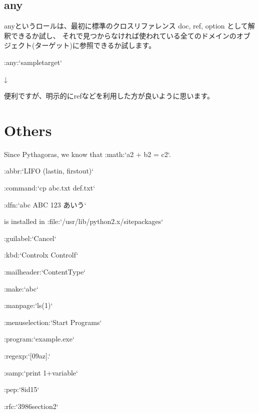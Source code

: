 \documentclass[letterpaper,10pt,dvipdfmx,openany,oneside]{sphinxmanual}
\begin{document}
{\hyperref[\detokenize{1.chapter/roles:sample-target}]{}}


\subsection{any}
\label{\detokenize{1.chapter/roles:any}}
anyというロールは、最初に標準のクロスリファレンス doc, ref, option として解釈できるか試し、
それで見つからなければ使われている全てのドメインのオブジェクト(ターゲット)に参照できるか試します。

%
\begin{sphinxVerbatim}[commandchars=\\\{\}]
:any:{}`sample\PYGZhy{}target{}`
\end{sphinxVerbatim}

↓

{\hyperref[\detokenize{1.chapter/roles:sample-target}]{}}

便利ですが、明示的にrefなどを利用した方が良いように思います。


\section{Others}
\label{\detokenize{1.chapter/roles:others}}
%
\begin{sphinxVerbatim}[commandchars=\\\{\}]
Since Pythagoras, we know that :math:{}`a\PYGZca{}2 + b\PYGZca{}2 = c\PYGZca{}2{}`.

:abbr:{}`LIFO (last\PYGZhy{}in, first\PYGZhy{}out){}`

:command:{}`cp abc.txt def.txt{}`

:dfn:{}`abc ABC 123 あいう{}`

is installed in :file:{}`/usr/lib/python2.\PYGZob{}x\PYGZcb{}/site\PYGZhy{}packages{}`

:guilabel:{}`\PYGZam{}Cancel{}`

:kbd:{}`Control\PYGZhy{}x Control\PYGZhy{}f{}`

:mailheader:{}`Content\PYGZhy{}Type{}`

:make:{}`abc{}`

:manpage:{}`ls(1){}`

:menuselection:{}`Start \PYGZhy{}\PYGZhy{}\PYGZgt{} Programs{}`

:program:{}`example.exe{}`

:regexp:{}`[0\PYGZhy{}9a\PYGZhy{}z].{}`

:samp:{}`print 1+\PYGZob{}variable\PYGZcb{}{}`

:pep:{}`8\PYGZsh{}id15{}`

:rfc:{}`3986\PYGZsh{}section\PYGZhy{}2{}`
\end{sphinxVerbatim}
\end{document}
